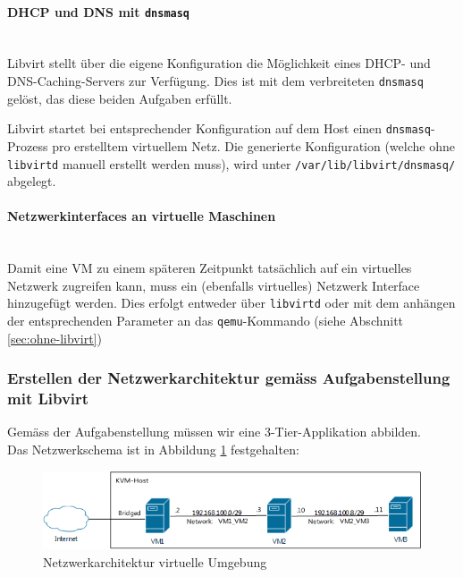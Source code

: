 \paragraph{DHCP und DNS mit \lstinline|dnsmasq|} \hfill \\
Libvirt stellt über die eigene Konfiguration die Möglichkeit eines DHCP- und DNS-Caching-Servers zur Verfügung. Dies ist mit dem verbreiteten \lstinline|dnsmasq| gelöst, das diese beiden Aufgaben erfüllt.

Libvirt startet bei entsprechender Konfiguration auf dem Host einen \lstinline|dnsmasq|-Prozess pro erstelltem virtuellem Netz. Die generierte Konfiguration (welche ohne \lstinline|libvirtd| manuell erstellt werden muss), wird unter \lstinline|/var/lib/libvirt/dnsmasq/| abgelegt.


\paragraph{Netzwerkinterfaces an virtuelle Maschinen} \hfill \\
Damit eine VM zu einem späteren Zeitpunkt tatsächlich auf ein virtuelles Netzwerk zugreifen kann, muss ein (ebenfalls virtuelles) Netzwerk Interface hinzugefügt werden. Dies erfolgt entweder über \lstinline|libvirtd| oder mit dem anhängen der entsprechenden Parameter an das \lstinline|qemu|-Kommando (siehe Abschnitt \ref{sec:ohne-libvirt})

\subsubsection{Erstellen der Netzwerkarchitektur gemäss Aufgabenstellung mit Libvirt}

Gemäss der Aufgabenstellung müssen wir eine 3-Tier-Applikation abbilden. \hfill \\
Das Netzwerkschema ist in Abbildung \ref{fig:network}  festgehalten:

\begin{figure}[h]
	\centering
	\includegraphics[width=\linewidth]{appendix/kvm/network}
	\caption{Netzwerkarchitektur virtuelle Umgebung}
	\label{fig:network}
\end{figure}

